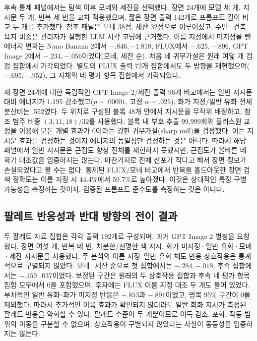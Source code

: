 \documentclass[11pt,a4paper]{article}
\begin{document}
후속 통제 패널에서는 탐색 이후 모네와 세잔을 선택했다. 장면 24개에 모델 세 개, 지시문 두 개, 반복 세 번을 교차 적용했으며, 짧은 장면 출력 142개로 프롬프트 길이 비교 두 개를 추가했다. 참조 패널은 모네 38점, 세잔 32점으로 이루어졌고, 수면·건축·육지 비중은 관리자가 실행한 LLM 시각 코딩에 근거했다. 이름 지정에서 미지정을 뺀 에너지 변화는 Nano Banana 2에서 $-.846,-1.818$, FLUX에서 $-.625,-.896$, GPT Image 2에서 $-.234,-.056$이었다(모네, 세잔 순). 처음 네 귀무가설은 원래 여덟 개 검정 집합에서 기각되었다. 별도의 FLUX 출력 72개 집합에서도 두 방향을 재현했으며($-.695,-.952$), 그 자체의 네 평가 항목 집합에서 기각되었다.

새 장면 24개에 대한 독립적인 GPT Image 2/세잔 출력 96개 비교에서는 일반 지시문 대비 에너지가 1.195 감소했고($p=.00001$, 고정 $\alpha=.025$), 화가 지정/일반 유화 전체 분산비는 .552였다. 두 위치로 구성된 블록 48개 안에서 지시문을 무작위 배정하고, 참조 범주 비중 $(3,11,18)/32$를 사용했다. 블록 내 부호 추출 99,999회와 플러스원 교정을 이용해 모든 개별 효과가 0이라는 강한 귀무가설(sharp null)을 검정했다. 이는 지시문 효과를 검정하는 것이지 에너지의 동일성만 검정하는 것은 아니다. 따라서 해당 패널에서 일반 지시문은 근접도 향상 전체를 재현하지 못했지만, 근접도가 올바른 네 화가 대조값을 입증하지는 않는다. 마찬가지로 전체 산포가 작다고 해서 장면 정보가 손실되었다고 볼 수는 없다. 통제된 FLUX/모네 비교에서 반복을 홀드아웃한 장면 검색 정확도는 이름 지정 시 44.4\%에서 59.7\%로 높아졌다. 이것은 상대적인 특징 구별 가능성을 측정하는 것이지, 검증된 프롬프트 준수도를 측정하는 것은 아니다.

\subsection{팔레트 반응성과 반대 방향의 전이 결과}
두 팔레트 자료 집합은 각각 출력 192개로 구성되며, 과거 GPT Image 2 별칭을 요청했다. 장면 여섯 개, 반복 네 번, 차분한/선명한 색 지시, 화가 미지정·일반 유화·모네·세잔 지시문을 사용했다. 주 분석의 이름 지정--일반 유화 채도 반응 상호작용은 통계적으로 구별되지 않았다. 모네·세잔 순으로 첫 집합에서는 $-.284,-.018$, 후속 집합에서는 $-.159,.037$이었다. 보정된 구간은 원래의 두 상호작용 집합과 후속 네 평가 항목 집합 모두에서 0을 포함했으며, 후자에는 FLUX 이름 지정 대조 두 개도 들어 있었다. 부차적인 일반 유화--화가 미지정 반응은 $-.853$과 $-.891$이었고, 명목 95\% 구간이 0을 제외했다. 따라서 추가적인 이름 효과가 확인되지 않더라도 일반 회화 지시가 측정된 팔레트 반응을 약화할 수 있다. 팔레트 수준이 두 개뿐이므로 이득 감소, 포화, 작동 범위의 이동을 구분할 수 없으며, 상호작용이 구별되지 않았다는 사실이 동등성을 입증하지는 않는다.
\end{document}

